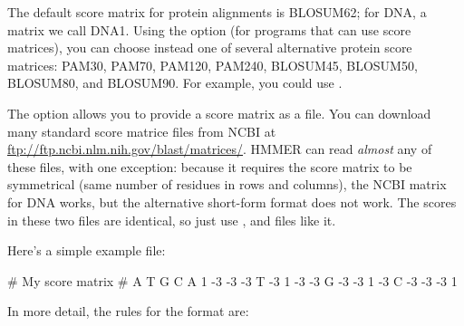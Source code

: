 The default score matrix for protein alignments is BLOSUM62; for DNA,
a matrix we call DNA1. Using the  option (for programs that
can use score matrices), you can choose instead one of several
alternative protein score matrices: PAM30, PAM70, PAM120, PAM240,
BLOSUM45, BLOSUM50, BLOSUM80, and BLOSUM90. For example, you could use
.

The  option allows you to provide a score matrix as a
file. You can download many standard score matrice files from NCBI at
\url{ftp://ftp.ncbi.nlm.nih.gov/blast/matrices/}. HMMER can read
\emph{almost} any of these files, with one exception: because it
requires the score matrix to be symmetrical (same number of residues
in rows and columns), the NCBI  matrix for DNA works,
but the alternative short-form format  does not
work. The scores in these two files are identical, so just use
, and files like it.

Here's a simple example file:

\begin{sreoutput}
# My score matrix
#
   A  T  G  C
A  1 -3 -3 -3
T -3  1 -3 -3
G -3 -3  1 -3
C -3 -3 -3  1
\end{sreoutput}

In more detail, the rules for the format are:

